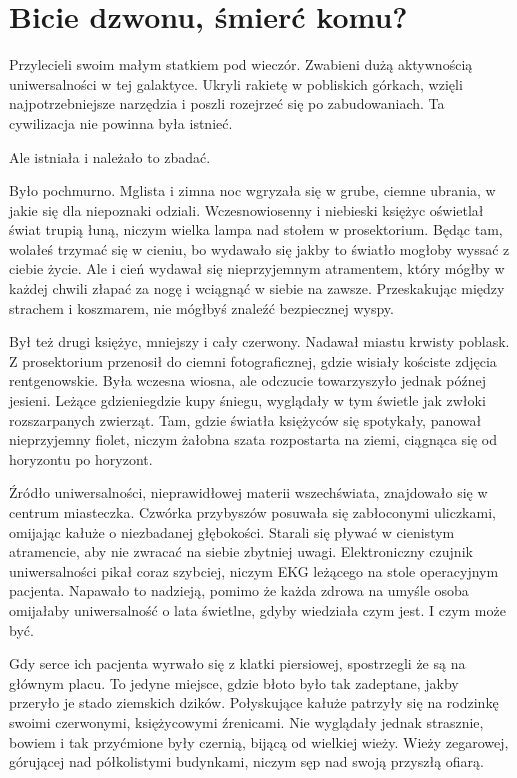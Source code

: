 \chapter{Bicie dzwonu, śmierć komu?}


Przylecieli swoim małym statkiem pod wieczór.
Zwabieni dużą aktywnością uniwersalności w tej galaktyce.
Ukryli rakietę w pobliskich górkach, wzięli najpotrzebniejsze narzędzia i poszli rozejrzeć się po zabudowaniach.
Ta cywilizacja nie powinna była istnieć.

Ale istniała i należało to zbadać.

Było pochmurno.
Mglista i zimna noc wgryzała się w grube, ciemne ubrania, w jakie się dla niepoznaki odziali.
Wczesnowiosenny i niebieski księżyc oświetlał świat trupią łuną, niczym wielka lampa nad stołem w prosektorium.
Będąc tam, wolałeś trzymać się w cieniu, bo wydawało się jakby to światło mogłoby wyssać z ciebie życie.
Ale i cień wydawał się nieprzyjemnym atramentem, który mógłby w każdej chwili złapać za nogę i wciągnąć w siebie na zawsze. 
Przeskakując między strachem i koszmarem, nie mógłbyś znaleźć bezpiecznej wyspy.

Był też drugi księżyc, mniejszy i cały czerwony.
Nadawał miastu krwisty poblask. 
Z prosektorium przenosił do ciemni fotograficznej, gdzie wisiały kościste zdjęcia rentgenowskie.
Była wczesna wiosna, ale odczucie towarzyszyło jednak późnej jesieni.
Leżące gdzieniegdzie kupy śniegu, wyglądały w tym świetle jak zwłoki rozszarpanych zwierząt.
Tam, gdzie światła księżyców się spotykały, panował nieprzyjemny fiolet, niczym żałobna szata rozpostarta na ziemi, ciągnąca się od horyzontu po horyzont.

Źródło uniwersalności, nieprawidłowej materii wszechświata, znajdowało się w centrum miasteczka.
Czwórka przybyszów posuwała się zabłoconymi uliczkami, omijając kałuże o niezbadanej głębokości.
Starali się pływać w cienistym atramencie, aby nie zwracać na siebie zbytniej uwagi.
Elektroniczny czujnik uniwersalności pikał coraz szybciej, niczym EKG leżącego na stole operacyjnym pacjenta.
Napawało to nadzieją, pomimo że każda zdrowa na umyśle osoba omijałaby uniwersalność o lata świetlne, gdyby wiedziała czym jest. I czym może być.

Gdy serce ich pacjenta wyrwało się z klatki piersiowej, spostrzegli że są na głównym placu. 
To jedyne miejsce, gdzie błoto było tak zadeptane, jakby przeryło je stado ziemskich dzików.
Połyskujące kałuże patrzyły się na rodzinkę swoimi czerwonymi, księżycowymi źrenicami.
Nie wyglądały jednak strasznie, bowiem i tak przyćmione były czernią, bijącą od wielkiej wieży.
Wieży zegarowej, górującej nad półkolistymi budynkami, niczym sęp nad swoją przyszłą ofiarą.

